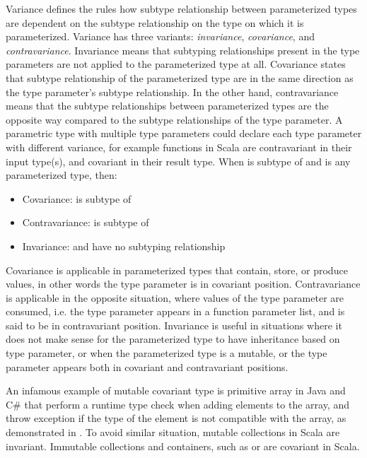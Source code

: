 Variance defines the rules how subtype relationship between parameterized types are dependent on the subtype relationship on the type on which it is parameterized. Variance has three variants: \textit{invariance}, \textit{covariance}, and \textit{contravariance}. Invariance means that subtyping relationships present in the type parameters are not applied to the parameterized type at all. Covariance states that subtype relationship of the parameterized type are in the same direction as the type parameter's subtype relationship. In the other hand, contravariance means that the subtype relationships between parameterized types are the opposite way compared to the subtype relationships of the type parameter. A parametric type with multiple type parameters could declare each type parameter with different variance, for example functions in Scala are contravariant in their input type(s), and covariant in their result type. When  is subtype of  and  is any parameterized type, then:
\begin{itemize}
    \item Covariance:  is subtype of 
    \item Contravariance:  is subtype of 
    \item Invariance:  and  have no subtyping relationship
\end{itemize}

Covariance is applicable in parameterized types that contain, store, or produce values, in other words the type parameter is in covariant position. Contravariance is applicable in the opposite situation, where values of the type parameter are consumed, i.e. the type parameter appears in a function parameter list, and is said to be in contravariant position. Invariance is useful in situations where it does not make sense for the parameterized type to have inheritance based on type parameter, or when the parameterized type is a mutable, or the type parameter appears both in covariant and contravariant positions.

An infamous example of mutable covariant type is primitive array in Java and C\# that perform a runtime type check when adding elements to the array, and throw exception if the type of the element is not compatible with the array, as demonstrated in .
To avoid similar situation, mutable collections in Scala are invariant. Immutable collections and containers, such as  or  are covariant in Scala.

